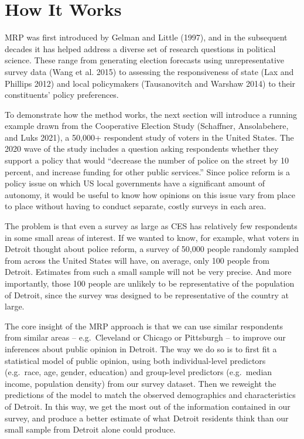 \documentclass[
]{article}
\begin{document}
\hypertarget{how-it-works}{%
\section{How It Works}\label{how-it-works}}

MRP was first introduced by Gelman and Little (1997), and in the
subsequent decades it has helped address a diverse set of research
questions in political science. These range from generating election
forecasts using unrepresentative survey data (Wang et al. 2015) to
assessing the responsiveness of state (Lax and Phillips 2012) and local
policymakers (Tausanovitch and Warshaw 2014) to their constituents'
policy preferences.

To demonstrate how the method works, the next section will introduce a
running example drawn from the Cooperative Election Study (Schaffner,
Ansolabehere, and Luks 2021), a 50,000+ respondent study of voters in
the United States. The 2020 wave of the study includes a question asking
respondents whether they support a policy that would ``decrease the
number of police on the street by 10 percent, and increase funding for
other public services.'' Since police reform is a policy issue on which
US local governments have a significant amount of autonomy, it would be
useful to know how opinions on this issue vary from place to place
without having to conduct separate, costly surveys in each area.

The problem is that even a survey as large as CES has relatively few
respondents in some small areas of interest. If we wanted to know, for
example, what voters in Detroit thought about police reform, a survey of
50,000 people randomly sampled from across the United States will have,
on average, only 100 people from Detroit. Estimates from such a small
sample will not be very precise. And more importantly, those 100 people
are unlikely to be representative of the population of Detroit, since
the survey was designed to be representative of the country at large.

The core insight of the MRP approach is that we can use similar
respondents from similar areas -- e.g.~Cleveland or Chicago or
Pittsburgh -- to improve our inferences about public opinion in Detroit.
The way we do so is to first fit a statistical model of public opinion,
using both individual-level predictors (e.g.~race, age, gender,
education) and group-level predictors (e.g.~median income, population
density) from our survey dataset. Then we reweight the predictions of
the model to match the observed demographics and characteristics of
Detroit. In this way, we get the most out of the information contained
in our survey, and produce a better estimate of what Detroit residents
think than our small sample from Detroit alone could produce.
\end{document}
